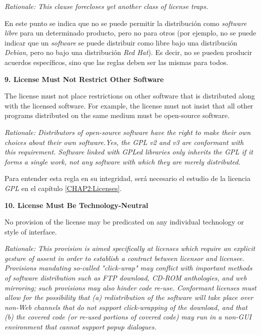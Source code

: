 \textit{Rationale: This clause forecloses yet another class of license
traps.}\newline

En este punto se indica que no se puede permitir la distribución como
\textit{software libre} para un determinado producto, pero no para otros (por
ejemplo, no se puede indicar que un \textit{software} se puede distribuir como
libre bajo una distribución \textit{Debian}, pero no bajo una distribución
\textit{Red Hat}). Es decir, no se pueden producir acuerdos específicos, sino
que las reglas deben ser las mismas para todos.\newline

{\bf 9. License Must Not Restrict Other Software

The license must not place restrictions on other software that is distributed
along with the licensed software. For example, the license must not insist that
all other programs distributed on the same medium must be open-source software.}

\textit{Rationale: Distributors of open-source software have the right to make
their own choices about their own software.\newline Yes, the GPL v2 and v3 are
conformant with this requirement. Software linked with GPLed libraries only
inherits the GPL if it forms a single work, not any software with which they are
merely distributed.}\newline

Para entender esta regla en su integridad, será necesario el estudio de la
licencia \textit{GPL} en el capítulo \ref{CHAP2:Licenses}.\newline

{\bf 10. License Must Be Technology-Neutral

No provision of the license may be predicated on any individual technology or
style of interface.}

\textit{Rationale: This provision is aimed specifically at licenses which
require an explicit gesture of assent in order to establish a contract between
licensor and licensee. Provisions mandating so-called "click-wrap" may conflict
with important methods of software distribution such as FTP download, CD-ROM
anthologies, and web mirroring; such provisions may also hinder code re-use.
Conformant licenses must allow for the possibility that (a) redistribution of
the software will take place over non-Web channels that do not support
click-wrapping of the download, and that (b) the covered code (or re-used
portions of covered code) may run in a non-GUI environment that cannot support
popup dialogues.}\newline

